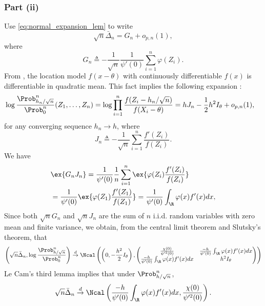 \subsubsection*{Part (ii)}
Use \eqref{eq:normal_expansion_lem} to write
\[
\sqrt{n} \bar{\Delta}_n = G_n + o_{p,n}(1),
\]
where
\[
G_n \triangleq -\frac{1}{\sqrt{n}} \frac{1}{\psi'(0)} \sum_{i=1}^{n} \varphi(Z_i). 
\]
From \cite[Exm. 7.8]{van2000asymptotic}, the location model $f(x-\theta)$ with continuously differentiable $f(x)$ is differentiable in quadratic mean. %
This fact implies the following expansion \cite[Thm. 7.2]{van2000asymptotic}:
\begin{align}
\label{eq:PJ_LAN}
& \log \frac{\Prob^n_{h_n/\sqrt{n}}}{\Prob^n_0} (Z_1,\ldots,Z_n) =  \log \prod_{i=1}^{n} \frac{f(Z_i-h_n/\sqrt{n})}  {f(X_i-\theta)} = h J_n - \frac{1}{2}h^2 I_{\theta} + o_{p,n}(1),
\end{align}
for any converging sequence $h_n \to h$, 
where 
\[
J_n \triangleq -\frac{1}{\sqrt{n}} \sum_{i=1}^n \frac{f'(Z_i)}{f(Z_i)} .
\]
We have
\begin{align*}
& \ex{ G_n J_n} = \frac{1}{\psi'(0)}\frac{1}{n} \sum_{i=1}^n \ex{ \varphi(Z_i) \frac{f'(Z_i)}{f(Z_i)} }  \\
& = \frac{1}{ \psi'(0)} \ex{ \varphi(Z_1) \frac{f'(Z_1)}{f(Z_1)}} =  \frac{1}{ \psi'(0)} \int_{\R} \varphi(x) f'(x) dx , 
\end{align*}
Since both $\sqrt{n}G_n$ and $\sqrt{n}J_n$ are the sum of $n$ i.i.d. random variables with zero mean and finite variance, we obtain, from the central limit theorem and Slutsky's theorem, that
\[
\left(\sqrt{n} \bar{\Delta}_n, \log \frac{\Prob^n_{h/\sqrt{n}}}{\Prob^n_0} \right) \overset{d}{\to} \Ncal \left( \left(0,-\frac{h^2}{2} I_\theta \right),  \begin{pmatrix}
\frac{\chi(0)}{\psi'^2(0)} & \frac{-h}{ \psi'(0)} \int_{\R} \varphi(x) f'(x) dx \\
\frac{-h}{ \psi'(0)} \int_{\R} \varphi(x) f'(x) dx & h^2 I_\theta 
\end{pmatrix}  \right)
\]
Le Cam's third lemma \cite[Exm. 6.7]{van2000asymptotic} implies that under $\Prob^n_{h/\sqrt{n}}$, 
\[
\sqrt{n}\bar{\Delta}_n \overset{d}{\to} \Ncal\left(\frac{-h}{ \psi'(0)} \int_{\R} \varphi(x) f'(x) dx,  \frac{\chi(0)}{\psi'^2(0)} \right).
\]
\QEDA

